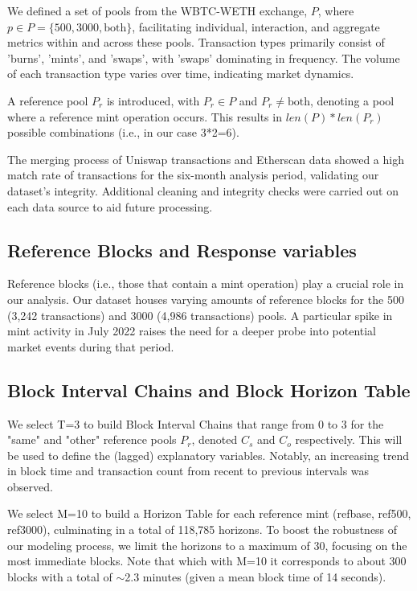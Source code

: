\documentclass{article}
\begin{document}
We defined a set of pools from the WBTC-WETH exchange, \(P\), where \(p \in P=\{500,3000,\text{both}\}\), facilitating individual, interaction, and aggregate metrics within and across these pools. Transaction types primarily consist of 'burns', 'mints', and 'swaps', with 'swaps' dominating in frequency. The volume of each transaction type varies over time, indicating market dynamics. 

A reference pool \(P_r\) is introduced, with \(P_r \in P\) and \(P_r \neq \text{both}\), denoting a pool where a reference mint operation occurs. This results in \(len(P) * len(P_r)\) possible combinations (i.e., in our case 3*2=6).

The merging process of Uniswap transactions and Etherscan data showed a high match rate of transactions for the six-month analysis period, validating our dataset's integrity. Additional cleaning and integrity checks were carried out on each data source to aid future processing.

\subsection{Reference Blocks and Response variables}

Reference blocks (i.e., those that contain a mint operation) play a crucial role in our analysis. Our dataset houses varying amounts of reference blocks for the 500 (3,242 transactions) and 3000 (4,986 transactions) pools. A particular spike in mint activity in July 2022 raises the need for a deeper probe into potential market events during that period.

\subsection{Block Interval Chains and Block Horizon Table}

We select T=3 to build Block Interval Chains that range from 0 to 3 for the "same" and "other" reference pools \(P_r\), denoted \(C_s\) and \(C_o\) respectively. This will be used to define the (lagged) explanatory variables. Notably, an increasing trend in block time and transaction count from recent to previous intervals was observed.

We select M=10 to build a Horizon Table for each reference mint (refbase, ref500, ref3000), culminating in a total of 118,785 horizons. To boost the robustness of our modeling process, we limit the horizons to a maximum of 30, focusing on the most immediate blocks. Note that which with M=10 it corresponds to about 300 blocks with a total of $\sim$2.3 minutes (given a mean block time of 14 seconds).
\end{document}
